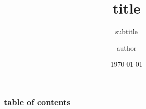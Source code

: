 \documentclass[10pt, xcolor={dvipsnames}]{beamer}
\title{title}
\subtitle{subtitle}
\author{author}
\date{\today}
\begin{document}
\frame{\titlepage}
\begin{frame}
\frametitle{table of contents}
\setcounter{tocdepth}{1}
\tableofcontents
\end{frame}




\end{document}
